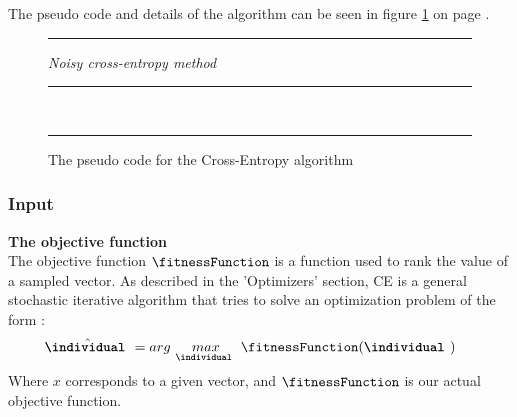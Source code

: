 The pseudo code and details of the algorithm can be seen in figure
\ref{fig:ceCode} on page \pageref{fig:ceCode}.

\begin{figure}[H]
\hrule
\vspace{0.2cm}
{\centering  \textit{Noisy cross-entropy method}}
\vspace{0.2cm}
\hrule
\begin{algorithmic}
\\

\Loop
{}
\EndLoop
\end{algorithmic}
\hrule
\caption{The pseudo code for the Cross-Entropy algorithm \label{fig:ceCode}}
\end{figure}

\subsubsection{Input}

\textbf{The objective function \label{CEObjective}} \\
The objective function $\fitnessFunction$ is a 
function used to rank the value of a sampled vector.
As described in the 'Optimizers' section, CE is a general stochastic 
iterative algorithm that tries to solve an optimization problem of 
the form \citep{thiery:09}:
\begin{align*}
\hat{\textbf{\individual }} &= 
arg \  \underset{\textbf{\individual }}{max} \  
\fitnessFunction (\textbf{\individual }) \ 
\end{align*}
Where $x$ corresponds to a given vector, 
and $\fitnessFunction$ is our actual objective function. 
\\

